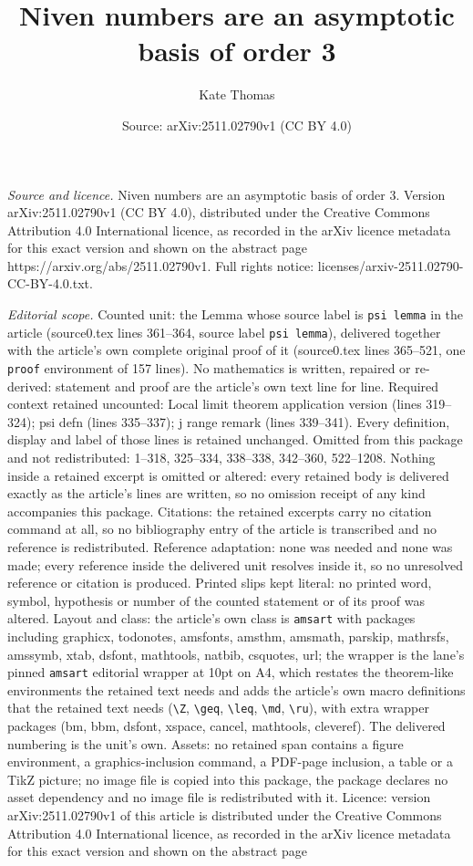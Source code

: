 \documentclass[10pt,a4paper]{amsart}
\title[Niven numbers are an asymptotic basis of order 3]{Niven numbers are an asymptotic basis of order 3}
\author{Kate Thomas}
\date{Source: arXiv:2511.02790v1 (CC BY 4.0)}
\begin{document}
\maketitle

\noindent\emph{Source and licence.} Niven numbers are an asymptotic basis of order 3. Version arXiv:2511.02790v1 (CC BY 4.0), distributed under the Creative Commons Attribution 4.0 International licence, as recorded in the arXiv licence metadata for this exact version and shown on the abstract page https://arxiv.org/abs/2511.02790v1. Full rights notice: licenses/arxiv-2511.02790-CC-BY-4.0.txt.\par\smallskip

\noindent\textit{Editorial scope.} Counted unit: the Lemma whose source label is \texttt{psi lemma} in the article (source0.tex lines 361--364, source label \texttt{psi lemma}), delivered together with the article's own complete original proof of it (source0.tex lines 365--521, one \texttt{proof} environment of 157 lines). No mathematics is written, repaired or re-derived: statement and proof are the article's own text line for line. Required context retained uncounted: Local limit theorem application version (lines 319--324); psi defn (lines 335--337); j range remark (lines 339--341). Every definition, display and label of those lines is retained unchanged. Omitted from this package and not redistributed: 1--318, 325--334, 338--338, 342--360, 522--1208. Nothing inside a retained excerpt is omitted or altered: every retained body is delivered exactly as the article's lines are written, so no omission receipt of any kind accompanies this package. Citations: the retained excerpts carry no citation command at all, so no bibliography entry of the article is transcribed and no reference is redistributed. Reference adaptation: none was needed and none was made; every reference inside the delivered unit resolves inside it, so no unresolved reference or citation is produced. Printed slips kept literal: no printed word, symbol, hypothesis or number of the counted statement or of its proof was altered. Layout and class: the article's own class is \texttt{amsart} with packages including graphicx, todonotes, amsfonts, amsthm, amsmath, parskip, mathrsfs, amssymb, xtab, dsfont, mathtools, natbib, csquotes, url; the wrapper is the lane's pinned \texttt{amsart} editorial wrapper at 10pt on A4, which restates the theorem-like environments the retained text needs and adds the article's own macro definitions that the retained text needs (\texttt{\textbackslash Z}, \texttt{\textbackslash geq}, \texttt{\textbackslash leq}, \texttt{\textbackslash md}, \texttt{\textbackslash ru}), with extra wrapper packages (bm, bbm, dsfont, xspace, cancel, mathtools, cleveref). The delivered numbering is the unit's own. Assets: no retained span contains a figure environment, a graphics-inclusion command, a PDF-page inclusion, a table or a TikZ picture; no image file is copied into this package, the package declares no asset dependency and no image file is redistributed with it. Licence: version arXiv:2511.02790v1 of this article is distributed under the Creative Commons Attribution 4.0 International licence, as recorded in the arXiv licence metadata for this exact version and shown on the abstract page 
\end{document}
